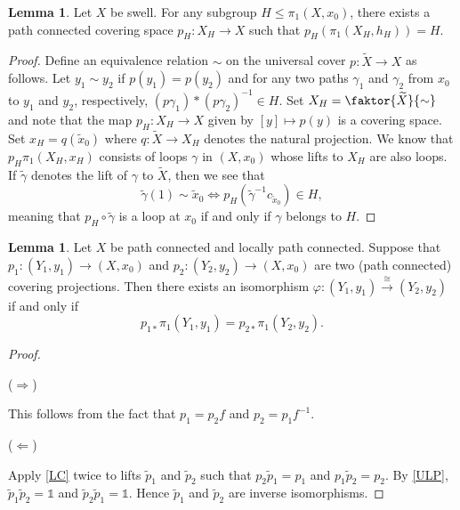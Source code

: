 \documentclass[10pt,letterpaper,cm]{nupset}
\theoremstyle{definition}
\theoremstyle{theorem}
\newtheorem{lemma}[definition]{Lemma}
\theoremstyle{remark}
\newcommand{\1}{\mathbb{1}}
\newcommand{\0}{\vec 0}
\begin{document}
\begin{lemma}
Let $X$ be swell. For any subgroup $H \leq \pi_1\left(X, x_0\right)$, there exists a path connected covering space $p_H : X_H \to X$ such that $p_H (\pi_1(X_H, h_H)) = H$.
\end{lemma}
\begin{proof}
Define an equivalence relation $\sim$ on the universal cover $p: \widetilde{X} \to X$ as follows. Let $y_1 \sim y_2$ if $p(y_1) = p(y_2)$ and for any two paths $\gamma_1$ and $\gamma_2$ from $x_0$ to $y_1$ and $y_2$, respectively, $\left(p\gamma_1\right)\ast \left(p\gamma_2\right)^{-1}\in H$. Set $X_H = \faktor{\widetilde{X}}{\sim}$ and note that the map $p_H : X_H \to X$ given by $\left[y\right] \mapsto p(y)$ is a covering space. Set $x_H= q(\tilde{x}_0)$ where $q: \widetilde{X} \to X_H$ denotes the natural projection. We know that $p_H \pi_1(X_H, x_H)$ consists of loops $\gamma$ in $\left(X, x_0\right)$ whose lifts to $X_H$ are also loops.  If $\tilde{\gamma}$ denotes the lift of $\gamma$ to $\widetilde{X}$, then we see that $$\tilde{\gamma}(1) \sim \tilde{x}_0 \iff p_H\left(\tilde{\gamma}^{-1} c_{\tilde{x} _0}\right) \in H,$$ meaning that  $p_H \circ \tilde{\gamma}$ is a loop at $x_0$ if and only if $\gamma$ belongs to $H$.
\end{proof}

\begin{lemma}
Let $X$ be path connected and locally path connected. Suppose that $p_1: \left(Y_1, y_1\right) \to \left(X, x_0\right)$ and $p_2 : (Y_2, y_2) \to \left(X, x_0\right)$ are two (path connected) covering projections. Then there exists an isomorphism $\varphi : \left(Y_1, y_1\right) \xrightarrow{\cong} \left(Y_2, y_2\right)$ if and only if  $$p_{1\ast} \pi_1(Y_1, y_1) = p_{2 \ast} \pi_1(Y_2, y_2).$$
\end{lemma}
\begin{proof} $ $
\smallskip

 ($\Longrightarrow$)

This follows from the fact that $p_1 = p_2f$ and $p_2 = p_1f^{-1}$. 

\medskip

 ($\Longleftarrow$) 
 
 Apply \cref{LC} twice to lifts $\tilde{p}_1$ and $\tilde{p}_2$ such that $p_2\tilde{p}_1 = p_1$ and $p_1\tilde{p}_2=p_2$. By \cref{ULP}, $\tilde{p}_1\tilde{p}_2=\1$ and $\tilde{p}_2\tilde{p}_1 = \1$. Hence $\tilde{p}_1$ and $\tilde{p}_2$ are inverse isomorphisms. 
\end{proof}
\end{document}
